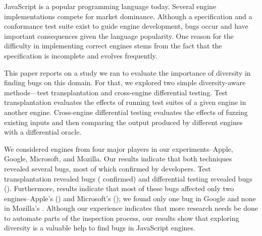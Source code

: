JavaScript is a popular programming language today. Several engine
implementations compete for market dominance. Although a specification
and a conformance test suite exist to guide engine development, bugs
occur and have important consequences given the language
popularity. One reason for the difficulty in implementing correct
engines stems from the fact that the specification is incomplete and
evolves frequently.

This paper reports on a study we ran to evaluate the importance of
diversity in finding bugs on this domain. For that, we explored two
simple diversity-aware methods---test transplantation and cross-engine
differential testing. Test transplantation evaluates the effects of
running test suites of a given engine in another engine. Cross-engine
differential testing evaluates the effects of fuzzing existing inputs
and then comparing the output produced by different engines with a
differential oracle.

We considered engines from four major players in our
experiments--Apple, Google, Microsoft, and Mozilla. Our results
indicate that both techniques revealed several bugs, most of which
confirmed by developers. Test transplantation
revealed \noBugsTransplantation{} bugs
(\noBugsTransplantationConfirmed{} confirmed) and differential testing
revealed \noBugsDifferentialTesting{} bugs
(\noBugsDifferentialTestingConfirmed{}). Furthermore, results indicate
that most of these bugs affected only two engines--Apple's
\jsc{} (\percJSC{}) and Microsoft's \chakra{} (\percChakra{}); we found
only one bug in Google \veight{} and none in Mozilla's
\smonkey{}. Although our experience indicates that more research needs
be done to automate parts of the inspection process, our results show
that exploring diversity is a valuable help to find bugs in JavaScript
engines.
